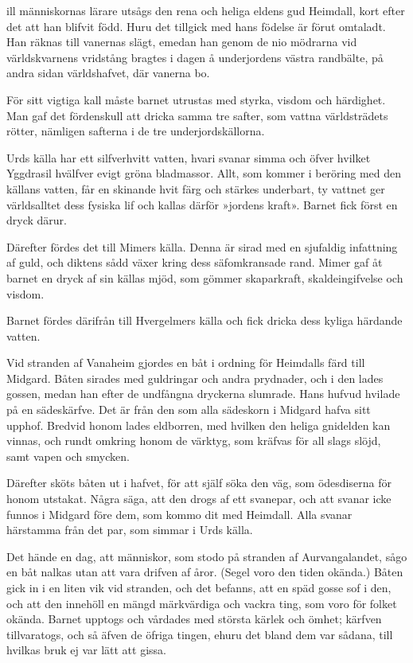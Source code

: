 
\dropcapT ill människornas lärare utsågs den rena och heliga eld\-ens gud Heimdall,
kort efter det att han blifvit född. Huru det tillgick med hans födelse
är förut omtaladt. Han räknas till vanernas slägt, emedan han genom de
nio mödrarna vid världskvarnens vridstång bragtes i dagen å underjordens
västra randbälte, på andra sidan världshafvet, där vanerna bo.

För sitt vigtiga kall måste barnet utrustas med styrka, visdom och
härdighet. Man gaf det fördenskull att dricka samma tre safter, som
vattna världsträdets rötter, nämligen safterna i de tre
underjordskällorna.

Urds källa har ett silfverhvitt vatten, hvari svanar simma och öfver
hvilket Yggdrasil hvälfver evigt gröna bladmassor. Allt, som kommer i
beröring med den källans vatten, får en skinande hvit färg och stärkes
underbart, ty vattnet ger världsalltet dess fysiska lif och kallas
därför »jordens kraft». Barnet fick först en dryck därur.

Därefter fördes det till Mimers källa. Denna är sirad med en sjufaldig
infattning af guld, och diktens sådd växer kring dess säfomkransade
rand. Mimer gaf åt barnet en dryck af sin källas mjöd, som gömmer
skaparkraft, skaldeingifvelse och visdom.

Barnet fördes därifrån till Hvergelmers källa och fick dricka dess
kyliga härdande vatten.

Vid stranden af Vanaheim gjordes en båt i ordning för Heimdalls färd
till Midgard. Båten sirades med guldringar och andra prydnader, och i
den lades gossen, medan han efter de undfångna dryckerna slumrade. Hans
hufvud hvilade på en sädeskärfve. Det är från den som alla sädeskorn i
Midgard hafva sitt upphof. Bredvid honom lades eldborren, med hvilken
den heliga gnidelden kan vinnas, och rundt omkring honom de värktyg, som
kräfvas för all slags slöjd, samt vapen och smycken.

Därefter sköts båten ut i hafvet, för att själf söka den väg, som
ödesdiserna för honom utstakat. Några säga, att den drogs af ett
svanepar, och att svanar icke funnos i Midgard före dem, som kommo dit
med Heimdall. Alla svanar härstamma från det par, som simmar i Urds
källa.

Det hände en dag, att människor, som stodo på stranden af
Aurvangalandet, sågo en båt nalkas utan att vara drifven af åror. (Segel
voro den tiden okända.) Båten gick in i en liten vik vid stranden, och
det befanns, att en späd gosse sof i den, och att den innehöll en mängd
märkvärdiga och vackra ting, som voro för folket okända. Barnet upptogs
och vårdades med största kärlek och ömhet; kärfven tillvaratogs, och så
äfven de öfriga tingen, ehuru det bland dem var sådana, till hvilkas
bruk ej var lätt att gissa.

